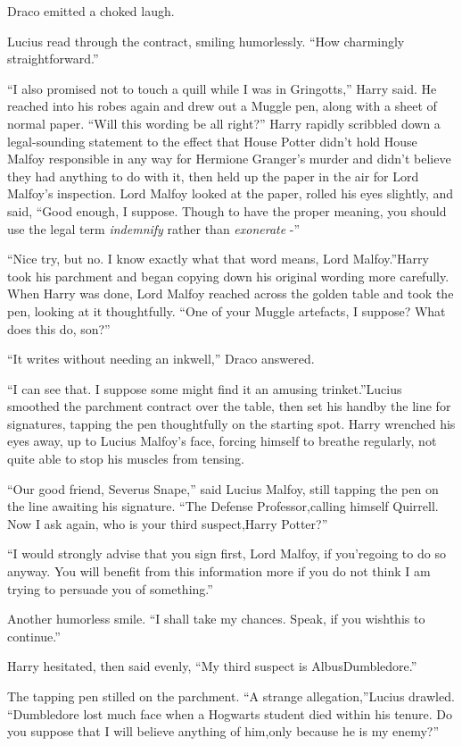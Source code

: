 Draco emitted a choked laugh.

Lucius read through the contract, smiling humorlessly. ``How charmingly straightforward.''

``I also promised not to touch a quill while I was in Gringotts,'' Harry said. He reached into his robes again and drew out a Muggle pen, along with a sheet of normal paper. ``Will this wording be all right?'' Harry rapidly scribbled down a legal-sounding statement to the effect that House Potter didn't hold House Malfoy responsible in any way for Hermione Granger's murder and didn't believe they had anything to do with it, then held up the paper in the air for Lord Malfoy's inspection.
Lord Malfoy looked at the paper, rolled his eyes slightly, and said,
``Good enough, I suppose. Though to have the proper meaning, you should use the legal term \emph{indemnify} rather than \emph{exonerate} -''

``Nice try, but no. I know exactly what that word means, Lord Malfoy.''Harry took his parchment and began copying down his original wording more carefully.
When Harry was done, Lord Malfoy reached across the golden table and took the pen, looking at it thoughtfully. ``One of your Muggle artefacts, I suppose? What does this do, son?''

``It writes without needing an inkwell,'' Draco answered.

``I can see that. I suppose some might find it an amusing trinket.''Lucius smoothed the parchment contract over the table, then set his handby the line for signatures, tapping the pen thoughtfully on the starting spot.
Harry wrenched his eyes away, up to Lucius Malfoy's face, forcing himself to breathe regularly, not quite able to stop his muscles from tensing.

``Our good friend, Severus Snape,'' said Lucius Malfoy, still tapping the pen on the line awaiting his signature. ``The Defense Professor,calling himself Quirrell. Now I ask again, who is your third suspect,Harry Potter?''

``I would strongly advise that you sign first, Lord Malfoy, if you'regoing to do so anyway. You will benefit from this information more if you do not think I am trying to persuade you of something.''

Another humorless smile. ``I shall take my chances. Speak, if you wishthis to continue.''

Harry hesitated, then said evenly, ``My third suspect is AlbusDumbledore.''

The tapping pen stilled on the parchment. ``A strange allegation,''Lucius drawled. ``Dumbledore lost much face when a Hogwarts student died within his tenure. Do you suppose that I will believe anything of him,only because he is my enemy?''

